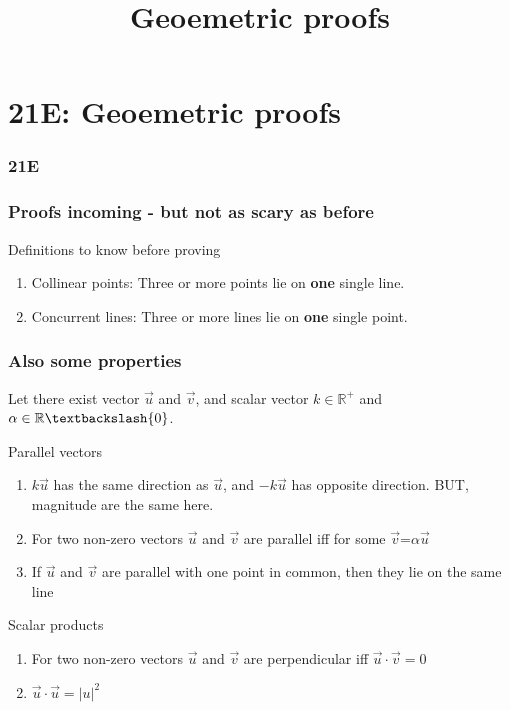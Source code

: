 \documentclass[
	11pt, %
]{beamer}
\begin{document}

\section{21E: Geoemetric proofs}
\begin{frame}
    \frametitle{21E}
    \begin{center}
        \title{Geoemetric proofs}
        \maketitle
    \end{center}
\end{frame}

\begin{frame}
    \frametitle{Proofs incoming - but not as scary as before}
    \begin{block}{Definitions to know before proving}
        \begin{enumerate}
            \item Collinear points: Three or more points lie on \textbf{one} single line.
            \item Concurrent lines: Three or more lines lie on \textbf{one} single point.
        \end{enumerate}
    \end{block}
\end{frame}

\begin{frame}
    \frametitle{Also some properties}
    Let there exist vector $\vec{u}$ and $\vec{v}$, and scalar vector $k\in \mathbb{R}^+$ and $\alpha \in \mathbb{R} \textbackslash \{0\}$.
    \begin{block}{Parallel vectors}
        \begin{enumerate}
            \item $k\vec{u}$ has the same direction as $\vec{u}$, and $-k\vec{u}$ has opposite direction. BUT, magnitude are the same here.
            \item For two non-zero vectors $\vec{u}$ and $\vec{v}$ are parallel iff for some $\vec{v}$=$\alpha\vec{u}$
            \item If $\vec{u}$ and $\vec{v}$ are parallel with one point in common, then they lie on the same line
        \end{enumerate}
    \end{block}
    \begin{block}{Scalar products}
        \begin{enumerate}
            \item For two non-zero vectors $\vec{u}$ and $\vec{v}$ are perpendicular iff $\vec{u}\cdot \vec{v} = 0$
            \item $\vec{u}\cdot \vec{u} = |u|^2$
        \end{enumerate}
    \end{block}
\end{frame}
\end{document}
